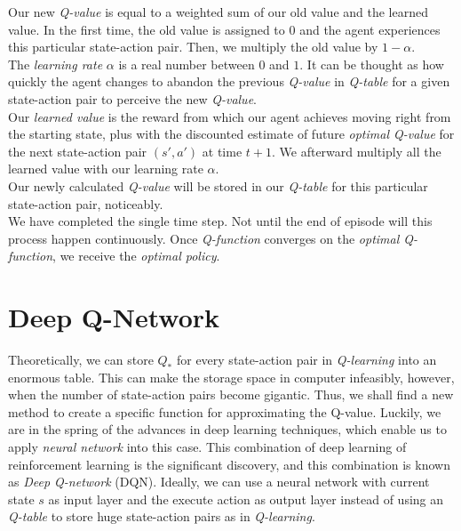 \documentclass{article}
\begin{document}
Our new \textit{Q-value} is equal to a weighted sum of our old value and the learned value. In the first time, the old value is assigned to $0$ and the agent experiences this particular state-action pair. Then, we multiply the old value by $1 - \alpha$.\\

The \textit{learning rate} $\alpha$ is a real number between $0$ and $1$. It can be thought as how quickly the agent changes to abandon the previous \textit{Q-value} in \textit{Q-table} for a given state-action pair to perceive the new \textit{Q-value}.\\

Our \textit{learned value} is the reward from which our agent achieves moving right from the starting state, plus with the discounted estimate of future \textit{optimal Q-value} for the next state-action pair $(s', a')$ at time $t + 1$. We afterward multiply all the learned value with our learning rate $\alpha$.\\

Our newly calculated \textit{Q-value} will be stored in our \textit{Q-table} for this particular state-action pair, noticeably.\\

We have completed the single time step. Not until the end of episode will this process happen continuously. Once \textit{Q-function} converges on the \textit{optimal Q-function}, we receive the \textit{optimal policy}.

\section{Deep Q-Network}
Theoretically, we can store $Q_{*}$ for every state-action pair in \textit{Q-learning} into an enormous table. This can make the storage space in computer infeasibly, however, when the number of state-action pairs become gigantic. Thus, we shall find a new method to create a specific function for approximating the Q-value. Luckily, we are in the spring of the advances in deep learning techniques, which enable us to apply \textit{neural network} \cite{NeuralNetwork} into this case. This combination of deep learning of reinforcement learning is the significant discovery, and this combination is known as \textit{Deep Q-network} (DQN). Ideally, we can use a neural network with current state $s$ as input layer and the execute action as output layer instead of using an \textit{Q-table} to store huge state-action pairs as in \textit{Q-learning}.\\
\end{document}
